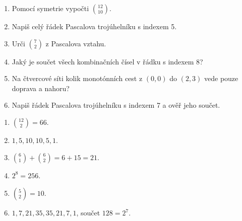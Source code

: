 \documentclass[11pt,a4paper]{article}
\begin{document}
\begin{zadaniReseniBox}[title={Domácí úkol}]

\begin{enumerate}[label=\alph*),leftmargin=*,itemsep=2pt]

\item Pomocí symetrie vypočti $\binom{12}{10}$.
\item Napiš celý řádek Pascalova trojúhelníku s indexem 5.
\item Urči $\binom72$ z Pascalova vztahu.
\item Jaký je součet všech kombinačních čísel v řádku s indexem 8?
\item Na čtvercové síti kolik monotónních cest z $(0,0)$ do $(2,3)$ vede pouze doprava a nahoru?
\item Napiš řádek Pascalova trojúhelníku s indexem 7 a ověř jeho součet.

\end{enumerate}

\tcblower

\begin{enumerate}[label=\alph*),leftmargin=*,itemsep=2pt]

\item $\binom{12}{2}=66$.
\item $1,5,10,10,5,1$.
\item $\binom61+\binom62=6+15=21$.
\item $2^8=256$.
\item $\binom52=10$.
\item $1,7,21,35,35,21,7,1$, součet $128=2^7$.

\end{enumerate}

\end{zadaniReseniBox}


\end{document}

